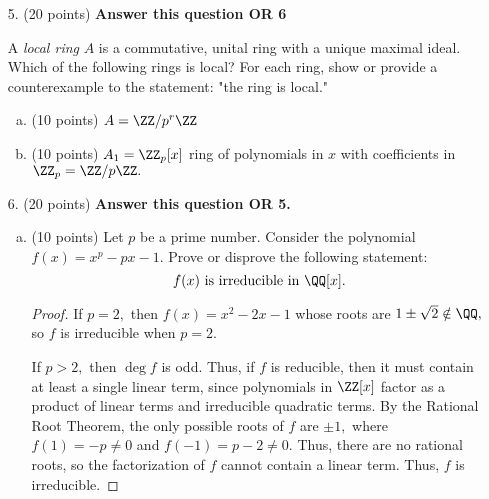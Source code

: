 \documentclass{article}
\begin{document}
\begin{itemize}
		\newpage

	\item[5.] (20 points) \textbf{Answer this question OR 6}

		A \textit{local ring} $A$ is a commutative, unital ring with a unique maximal ideal. Which of the following rings is local? For each ring, show or provide a counterexample to the statement: "the ring is local."
		\begin{enumerate}[(a)]
			\item (10 points) $A=\ZZ/p^r\ZZ$

			\item (10 points) $A_1=\ZZ_p[x]$ ring of polynomials in $x$ with coefficients in $\ZZ_p=\ZZ/p\ZZ.$
				
		\end{enumerate}

		\newpage

	\item[6.] (20 points) \textbf{Answer this question OR 5.}
		\begin{enumerate}[(a)]
			\item (10 points) Let $p$ be a prime number. Consider the polynomial $f(x)=x^p-px-1.$ Prove or disprove the following statement:
				\[f(x)\text{ is irreducible in }\QQ[x].\]
				\begin{proof}
					If $p=2,$ then $f(x)=x^2-2x-1$ whose roots are $1\pm \sqrt{2}\notin \QQ,$ so $f$ is irreducible when $p=2.$ 

					If $p>2,$ then $\deg f$ is odd. Thus, if $f$ is reducible, then it must contain at least a single linear term, since polynomials in $\ZZ[x]$ factor as a product of linear terms and irreducible quadratic terms. By the Rational Root Theorem, the only possible roots of $f$ are $\pm 1,$ where $f(1)=-p\neq 0$ and $f(-1)=p-2\neq 0.$ Thus, there are no rational roots, so the factorization of $f$ cannot contain a linear term. Thus, $f$ is irreducible.
				\end{proof}


\end{enumerate}
\end{itemize}
\end{document}
